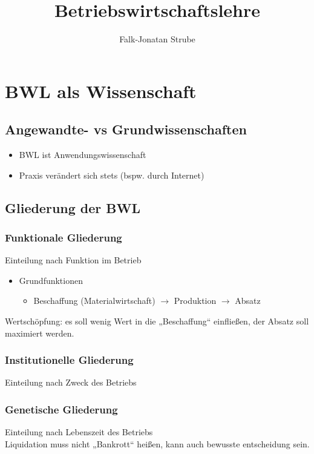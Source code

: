 \documentclass{scrreprt}
\title{Betriebswirtschaftslehre}
\author{Falk-Jonatan Strube}
\begin{document}
\maketitle
\tableofcontents


\chapter{BWL als Wissenschaft}
\section{Angewandte- vs Grundwissenschaften}
\begin{itemize}
\item BWL ist Anwendungswissenschaft
\item Praxis verändert sich stets (bspw. durch Internet)
\end{itemize}
\section{Gliederung der BWL}
\subsection{Funktionale Gliederung}
Einteilung nach Funktion im Betrieb
\begin{itemize}
\item Grundfunktionen
\begin{itemize}
\item Beschaffung (Materialwirtschaft) $\rightarrow$ Produktion $\rightarrow$ Absatz
\end{itemize}
\end{itemize}
Wertschöpfung: es soll wenig Wert in die „Beschaffung“ einfließen, der Absatz soll maximiert werden.
\subsection{Institutionelle Gliederung}
Einteilung nach Zweck des Betriebs

\subsection{Genetische Gliederung}
Einteilung nach Lebenszeit des Betriebs\\
Liquidation muss nicht „Bankrott“ heißen, kann auch bewusste entscheidung sein.
\end{document}
